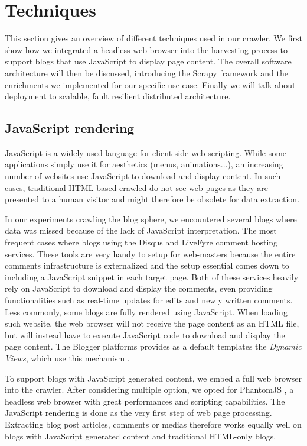 \section{Techniques}

This section gives an overview of different techniques used in our crawler. We first show how we integrated a headless web browser into the harvesting process to support blogs that use JavaScript to display page content. The overall software architecture will then be discussed, introducing the Scrapy framework and the enrichments we implemented for our specific use case. Finally we will talk about deployment to scalable, fault resilient distributed architecture.


\subsection{JavaScript rendering}
JavaScript is a widely used language for client-side web scripting. While some applications simply use it for aesthetics (menus, animations...), an increasing number of websites use JavaScript to download and display content. In such cases, traditional HTML based crawled do not see web pages as they are presented to a human visitor and might therefore be obsolete for data extraction.

In our experiments crawling the blog sphere, we encountered several blogs where data was missed because of the lack of JavaScript interpretation. The most frequent cases where blogs using the Disqus \cite{disqus2013} and LiveFyre \cite{livefyre2013} comment hosting services. These tools are very handy to setup for web-masters because the entire comments infrastructure is externalized and the setup essential comes down to including a JavaScript snippet in each target page. Both of these services heavily rely on JavaScript to download and display the comments, even providing functionalities such as real-time updates for edits and newly written comments. Less commonly, some blogs are fully rendered using JavaScript. When loading such website, the web browser will not receive the page content as an HTML file, but will instead have to execute JavaScript code to download and display the page content. The Blogger platforms provides as a default templates the \emph{Dynamic Views}, which use this mechanism \cite{antinharasymiv2011}.

To support blogs with JavaScript generated content, we embed a full web browser into the crawler. After considering multiple option, we opted for PhantomJS \cite{phantomjs2013}, a headless web browser with great performances and scripting capabilities. The JavaScript rendering is done as the very first step of web page processing. Extracting blog post articles, comments or medias therefore works equally well on blogs with JavaScript generated content and traditional HTML-only blogs.

